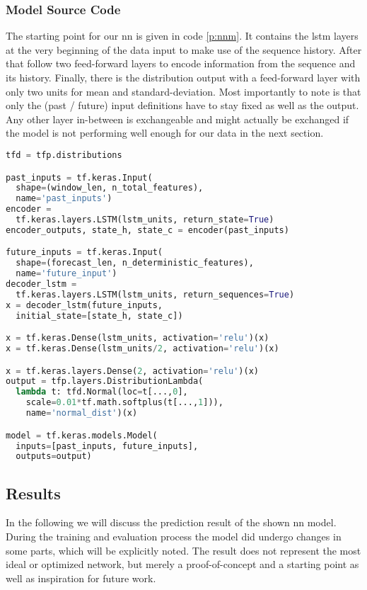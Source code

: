		\subsubsection{Model Source Code}
		The starting point for our \ac{nn} is given in code \ref{p:nnm}. It contains the \ac{lstm} layers at the very beginning of the data input to make use of the sequence history. After that follow two feed-forward layers to encode information from the sequence and its history. Finally, there is the distribution output with a feed-forward layer with only two units for mean and standard-deviation. \newline
		Most importantly to note is that only the (past / future) input definitions have to stay fixed as well as the output. Any other layer in-between is exchangeable and might actually be exchanged if the model is not performing well enough for our data in the next section.
		
		\begin{lstlisting}[caption={Neural Network Model}, language=python, label={p:nnm}]
tfd = tfp.distributions

past_inputs = tf.keras.Input(
  shape=(window_len, n_total_features), 
  name='past_inputs')
encoder = 
  tf.keras.layers.LSTM(lstm_units, return_state=True)
encoder_outputs, state_h, state_c = encoder(past_inputs)

future_inputs = tf.keras.Input(
  shape=(forecast_len, n_deterministic_features),
  name='future_input')
decoder_lstm = 
  tf.keras.layers.LSTM(lstm_units, return_sequences=True)
x = decoder_lstm(future_inputs,
  initial_state=[state_h, state_c])

x = tf.keras.Dense(lstm_units, activation='relu')(x)
x = tf.keras.Dense(lstm_units/2, activation='relu')(x)

x = tf.keras.layers.Dense(2, activation='relu')(x)
output = tfp.layers.DistributionLambda(
  lambda t: tfd.Normal(loc=t[...,0],
    scale=0.01*tf.math.softplus(t[...,1])),
    name='normal_dist')(x)

model = tf.keras.models.Model(
  inputs=[past_inputs, future_inputs],
  outputs=output)
		\end{lstlisting}	

	\subsection{Results}
	In the following we will discuss the prediction result of the shown \ac{nn} model. During the training and evaluation process the model did undergo changes in some parts, which will be explicitly noted. \newline
	The result does not represent the most ideal or optimized network, but merely a proof-of-concept and a starting point as well as inspiration for future work.
		
